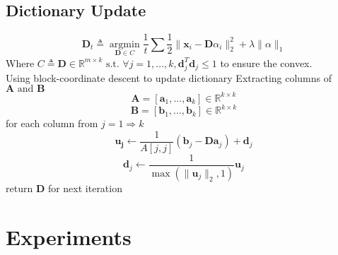 \documentclass[UTF8]{article}
\begin{document}
    \subsection{Dictionary Update}
    \[\bm{D}_t \triangleq \mathop{\arg\min}\limits_{\bm{D} \in C} \frac{1}{t} \sum{ \frac{1}{2} \| \bm{x}_i - \bm{D} \alpha_i  \|^2_2 + \lambda \|\alpha\|_1}
    \]
    Where $C \triangleq {\bm{D} \in \mathbb{R}^{m \times k} \text{ s.t. } \forall j = 1, ..., k, \bm{d}_j^T\bm{d}_j \leq 1}$ to ensure the convex.
    \\
    Using block-coordinate descent to update dictionary
    Extracting columns of $\bm{A} \text{ and } \bm{B}$
    \[\bm{A} = [\bm{a}_1, ..., \bm{a}_k] \in \mathbb{R}^{k \times k}\]
    \[\bm{B} = [\bm{b}_1, ..., \bm{b}_k] \in \mathbb{R}^{k \times k}\]
    for each column from $j = 1 \Rightarrow k$
    \[\bm{u_j} \leftarrow \frac{1}{A[j, j]}(\bm{b}_j - \bm{Da}_j) + \bm{d}_j\]
    \[\bm{d}_j \leftarrow \frac{1}{\max(\|\bm{u}_j\|_2, 1)}\bm{u}_j\]
    return $\bm{D}$ for next iteration
    \section{Experiments}
    \subsection{}

    
    
    \nocite{*}
\end{document}
